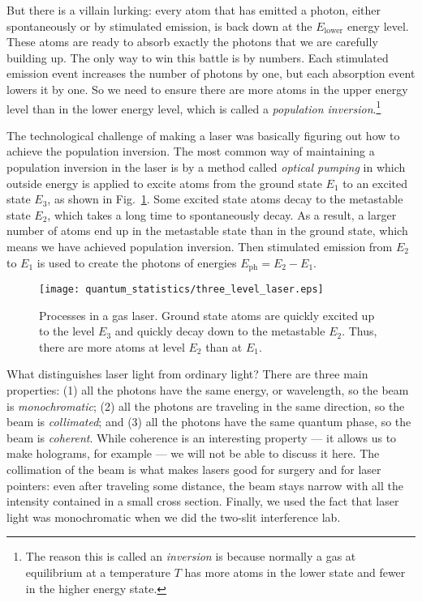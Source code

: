 But there is a villain lurking:
every atom that has emitted a photon, either spontaneously or
by stimulated emission, is back down at the $E_\text{lower}$ energy
level.  These atoms are ready to absorb exactly the photons that
we are carefully building up.  The only way to win this battle is by
numbers.  Each stimulated emission event increases the number of
photons by one, but each absorption event lowers it by one.  So we
need to ensure there are more atoms in the upper energy level than in
the lower energy level, which is called a \textit{population
  inversion}.\footnote{The reason this is called an {\it inversion} is
  because normally a gas at equilibrium at a temperature $T$ has more
  atoms in the lower state and fewer in the higher energy state.}

The technological challenge of making a laser was basically figuring
out how to achieve the population inversion.  The most common way of
maintaining a population inversion in the laser is by a method called
{\it optical pumping} in which outside energy is applied to excite
atoms from the ground state $E_1$ to an excited state $E_3$, as shown
in Fig.~\ref{fig:three_level_laser}.  Some excited state atoms decay
to the metastable state $E_2$, which takes a long time to
spontaneously decay.  As a result, a larger number of atoms end up in
the metastable state than in the ground state, which means we have
achieved population inversion.  Then stimulated emission from $E_2$ to
$E_1$ is used to create the photons of energies $E_\text{ph}=E_2 -
E_1$.

\begin{figure}[h]
\begin{center}
\texttt{[image: quantum\_statistics/three\_level\_laser.eps]}
\caption{Processes in a gas laser.  Ground state atoms are quickly
  excited up to the level $E_3$ and quickly decay down to the
  metastable $E_2$.  Thus, there are more atoms at level $E_2$ than at
  $E_1$.}
\label{fig:three_level_laser}
\end{center}
\end{figure}

What distinguishes laser light from ordinary light?  There are three
main properties: (1) all the photons have the same energy, or
wavelength, so the beam is \textit{monochromatic}; (2) all the photons
are traveling in the same direction, so the beam is
\textit{collimated}; and (3) all the photons have the same quantum
phase, so the beam is \textit{coherent}.  While coherence is an
interesting property --- it allows us to make holograms, for example
--- we will not be able to discuss it here.  The collimation of the
beam is what makes lasers good for surgery and for laser pointers:
even after traveling some distance, the beam stays narrow with all
the intensity contained in a small cross section.  Finally, we used the fact
that laser light was monochromatic when we did the two-slit interference
lab.


